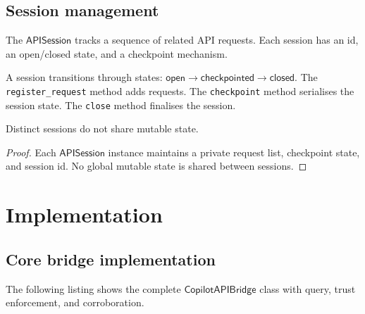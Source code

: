 \documentclass[11pt]{article}
\newcommand{\Bridge}{\mathsf{CopilotAPIBridge}}
\newcommand{\APISess}{\mathsf{APISession}}
\begin{document}
\subsection{Session management}

The $\APISess$ tracks a sequence of related API requests.
Each session has an id, an open/closed state, and a
checkpoint mechanism.

\begin{definition}\label{def:sesslife}
A session transitions through states:
$\mathsf{open} \to \mathsf{checkpointed} \to \mathsf{closed}$.
The \texttt{register\_request} method adds requests.
The \texttt{checkpoint} method serialises the session state.
The \texttt{close} method finalises the session.
\end{definition}

\begin{lemma}\label{lem:sessiso}
Distinct sessions do not share mutable state.
\end{lemma}
\begin{proof}
Each $\APISess$ instance maintains a private request list,
checkpoint state, and session id.  No global mutable state
is shared between sessions.
\end{proof}

\section{Implementation}\label{sec:code}

\subsection{Core bridge implementation}

The following listing shows the complete $\Bridge$
class with query, trust enforcement, and corroboration.
\end{document}
